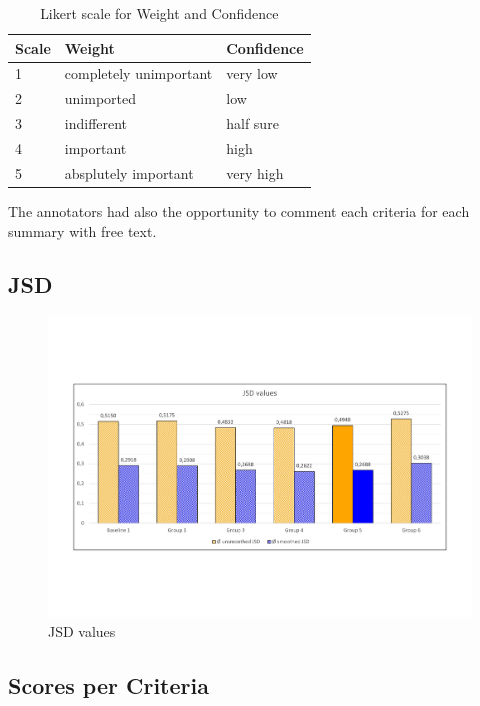 \begin{table}[H]
	\begin{tabularx}{\textwidth}{l|XX} \toprule
		Scale & Weight & Confidence \\ \midrule
		1 & completely unimportant & very low \\
		2 & unimported & low \\
		3 & indifferent & half sure \\
		4 & important & high \\
		5 & absplutely important & very high \\ \bottomrule    
	\end{tabularx}
	\caption{Likert scale for Weight and Confidence}
	\label{tab:evalikert}
\end{table}

The annotators had also the opportunity to comment each criteria for each summary with free text.

\subsection{JSD}

\begin{figure}[H]
	\centering
	\includegraphics[trim= 0 150 0 150,width=\textwidth]{img/jsd.pdf}
	\caption{JSD values}
	\label{fig:jsd}
\end{figure}


\subsection{Scores per Criteria}

